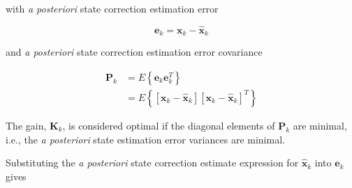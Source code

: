 with \textit{a posteriori} state correction estimation error

\begin{equation*}
    \mathbf{e}_{k} = \mathbf{x}_{k} - \hat{\mathbf{x}}_{k}
\end{equation*}

and \textit{a posteriori} state correction estimation error covariance

\begin{equation*}
    \begin{aligned}
        \mathbf{P}_{k} &= E \left\{ \mathbf{e}_{k} \mathbf{e}_{k}^T \right\} \\
        &= E \left\{ \left[ \mathbf{x}_{k} - \hat{\mathbf{x}}_{k} \right] \left[ \mathbf{x}_{k} - \hat{\mathbf{x}}_{k} \right]^T \right\}
    \end{aligned}
\end{equation*}

The gain, $\mathbf{K}_k$, is considered optimal if the diagonal elements of $\mathbf{P}_k$
are minimal, i.e., the \textit{a posteriori} state estimation error variances are minimal.

Substituting the \textit{a posteriori} state correction estimate expression for
$\hat{\mathbf{x}}_k$ into $\mathbf{e}_k$ gives

